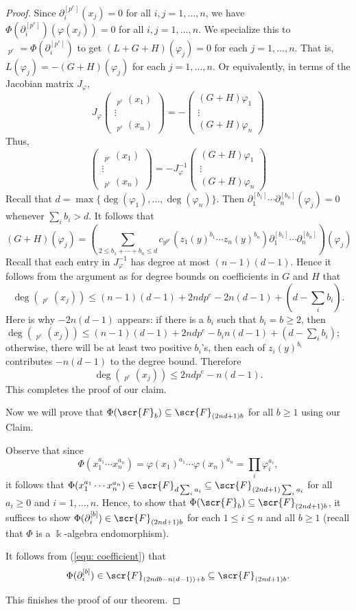 \documentclass[11pt]{amsart}
\theoremstyle{definition}
\theoremstyle{remark}
\numberwithin{equation}{subsection}
\DeclareMathOperator{\kk}{\Bbbk}
\DeclareMathOperator{\tp}{\tilde{\partial}}
\begin{document}
\begin{proof}
Since $\partial^{[p^e]}_i(x_j)=0$ for all $i,j=1,\dots,n$, we have $\Phi(\partial^{[p^e]}_i)(\varphi(x_j))=0$ for all $i,j=1,\dots,n$. We specialize this to $\tp_{p^e}=\Phi(\partial^{[p^e]}_i)$ to get $(L+G+H)(\varphi_j)=0$ for each $j=1,\dots,n$. That is, $L(\varphi_j)=-(G+H)(\varphi_j)$ for each $j=1,\dots,n$. Or equivalently, in terms of the Jacobian matrix $J_{\varphi}$, 
\[J_{\varphi}\begin{pmatrix}\tp_{p^e}(x_1)\\ \vdots\\ \tp_{p^e}(x_n) \end{pmatrix}=-\begin{pmatrix}(G+H)\varphi_1\\ \vdots\\ (G+H)\varphi_n \end{pmatrix}\]
Thus,
\[\begin{pmatrix}\tp_{p^e}(x_1)\\ \vdots\\ \tp_{p^e}(x_n) \end{pmatrix}=-J^{-1}_{\varphi}\begin{pmatrix}(G+H)\varphi_1\\ \vdots\\ (G+H)\varphi_n \end{pmatrix}\]
Recall that $d=\max\{\deg(\varphi_1),\dots,\deg(\varphi_n)\}$. Then $\partial^{[b_1]}_1\cdots \partial^{[b_n]}_n(\varphi_j)=0$ whenever $\sum_ib_i>d$. It follows that 
\[(G+H)(\varphi_j)=\left(\sum_{2\leq b_1+\cdots+b_n\leq d}c_{y^{p^e}}(z_1(y)^{b_1}\cdots z_n(y)^{b_n})\partial^{[b_1]}_1\cdots \partial^{[b_n]}_n \right)(\varphi_j)\]
Recall that each entry in $J^{-1}_{\varphi}$ has degree at most $(n-1)(d-1)$. Hence it follows from the argument as for degree bounds on coefficients in $G$ and $H$ that
\[\deg(\tp_{p^e}(x_j))\leq (n-1)(d-1)+2ndp^e-2n(d-1)+(d-\sum_ib_i).\]
Here is why $-2n(d-1)$ appears: if there is a $b_i$ such that $b_i=b\geq 2$, then $\deg(\tp_{p^e}(x_j))\leq (n-1)(d-1)+2ndp^e-b_in(d-1)+(d-\sum_ib_i)$; otherwise, there will be at least two positive $b_i$'s, then each of $z_i(y)^{b_i}$ contributes $-n(d-1)$ to the degree bound. Therefore
\[\deg(\tp_{p^e}(x_j))\leq 2ndp^e-n(d-1).\]
This completes the proof of our claim.

Now we will prove that $\Phi(\scr{F}_b)\subseteq \scr{F}_{(2nd+1)b}$ for all $b\geq 1$ using our Claim.

Observe that since 
\[\Phi(x^{a_1}_1\cdots x^{a_n}_n)=\varphi(x_1)^{a_1}\cdots \varphi(x_n)^{a_n}=\prod_i\varphi_i^{a_i},\] 
it follows that $\Phi(x^{a_1}_1\cdots x^{a_n}_n)\in \scr{F}_{d\sum_ia_i}\subseteq \scr{F}_{(2nd+1)\sum_ia_i}$ for all $a_i\geq 0$ and $i=1,\dots,n$. Hence, to show that $\Phi(\scr{F}_b)\subseteq \scr{F}_{(2nd+1)b}$, it suffices to show $\Phi(\partial^{[b]}_i)\in \scr{F}_{(2nd+1)b}$ for each $1\leq i\leq n$ and all $b\geq 1$ (recall that $\Phi$ is a $\kk$-algebra endomorphism). 

It follows from (\ref{equ: coefficient}) that 
\[\Phi(\partial^{[b]}_i)\in\scr{F}_{(2ndb-n(d-1))+b}\subseteq \scr{F}_{(2nd+1)b}.\]


This finishes the proof of our theorem.
\end{proof}
\end{document}
